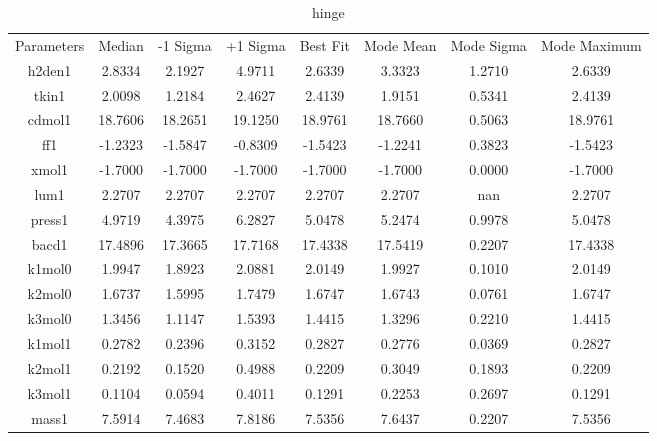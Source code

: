 \begin{table}
\caption{hinge}
\begin{tabular}{cccccccc}
Parameters & Median & -1 Sigma & +1 Sigma & Best Fit & Mode Mean & Mode Sigma & Mode Maximum \\
h2den1 & 2.8334 & 2.1927 & 4.9711 & 2.6339 & 3.3323 & 1.2710 & 2.6339 \\
tkin1 & 2.0098 & 1.2184 & 2.4627 & 2.4139 & 1.9151 & 0.5341 & 2.4139 \\
cdmol1 & 18.7606 & 18.2651 & 19.1250 & 18.9761 & 18.7660 & 0.5063 & 18.9761 \\
ff1 & -1.2323 & -1.5847 & -0.8309 & -1.5423 & -1.2241 & 0.3823 & -1.5423 \\
xmol1 & -1.7000 & -1.7000 & -1.7000 & -1.7000 & -1.7000 & 0.0000 & -1.7000 \\
lum1 & 2.2707 & 2.2707 & 2.2707 & 2.2707 & 2.2707 & nan & 2.2707 \\
press1 & 4.9719 & 4.3975 & 6.2827 & 5.0478 & 5.2474 & 0.9978 & 5.0478 \\
bacd1 & 17.4896 & 17.3665 & 17.7168 & 17.4338 & 17.5419 & 0.2207 & 17.4338 \\
k1mol0 & 1.9947 & 1.8923 & 2.0881 & 2.0149 & 1.9927 & 0.1010 & 2.0149 \\
k2mol0 & 1.6737 & 1.5995 & 1.7479 & 1.6747 & 1.6743 & 0.0761 & 1.6747 \\
k3mol0 & 1.3456 & 1.1147 & 1.5393 & 1.4415 & 1.3296 & 0.2210 & 1.4415 \\
k1mol1 & 0.2782 & 0.2396 & 0.3152 & 0.2827 & 0.2776 & 0.0369 & 0.2827 \\
k2mol1 & 0.2192 & 0.1520 & 0.4988 & 0.2209 & 0.3049 & 0.1893 & 0.2209 \\
k3mol1 & 0.1104 & 0.0594 & 0.4011 & 0.1291 & 0.2253 & 0.2697 & 0.1291 \\
mass1 & 7.5914 & 7.4683 & 7.8186 & 7.5356 & 7.6437 & 0.2207 & 7.5356 \\
\end{tabular}
\end{table}
